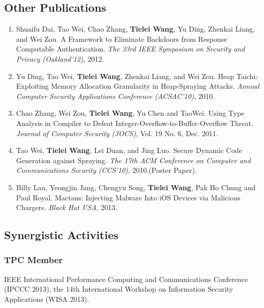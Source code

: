 \documentclass[letterpaper,twoside,11pt,headings=small]{scrartcl}
\begin{document}
\subsection*{Other Publications}

\begin{enumerate}

    \item Shuaifu Dai, Tao Wei, Chao Zhang, \textbf{Tielei Wang}, Yu Ding, Zhenkai Liang, and Wei Zou. A Framework to Eliminate Backdoors from Response Computable Authentication. \emph{The 33rd IEEE Symposium on Security and Privacy (Oakland'12)}, 2012.

    \item Yu Ding, Tao Wei, \textbf{Tielei Wang}, Zhenkai Liang, and Wei Zou. Heap Taichi: Exploiting Memory Allocation Granularity in Heap-Spraying Attacks. \emph{Annual Computer Security Applications Conference (ACSAC'10)},  2010.

    \item Chao Zhang, Wei Zou, \textbf{Tielei Wang}, Yu Chen and TaoWei. Using Type Analysis in Compiler to Defeat Integer-Overflow-to-Buffer-Overflow Threat. \emph{Journal of Computer Security (JOCS)}, Vol. 19 No. 6, Dec. 2011.

    \item Tao Wei, \textbf{Tielei Wang}, Lei Duan, and Jing Luo. Secure Dynamic Code Generation against Spraying. \emph{The 17th ACM Conference on Computer and Communications Security (CCS'10)}, 2010.(Poster Paper).

    \item Billy Lau, Yeongjin Jang, Chengyu Song, \textbf{Tielei Wang}, Pak Ho Chung and Paul Royal. Mactans: Injecting Malware Into iOS Devices via Malicious Chargers. \emph{Black Hat USA}, 2013.

\end{enumerate}

\subsection*{Synergistic Activities}

\subsubsection*{TPC Member}

IEEE International Performance Computing and Communications Conference
(IPCCC 2013), the 14th International Workshop on Information Security
Applications (WISA 2013).
\end{document}
